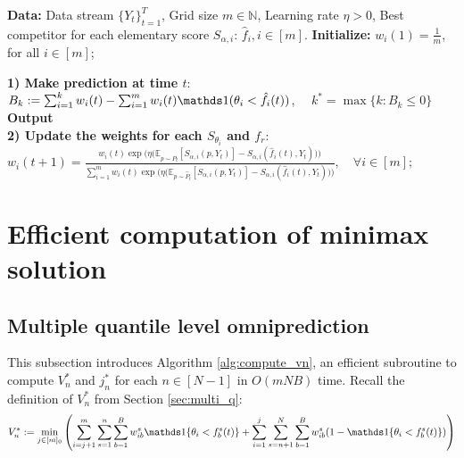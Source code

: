 \begin{algorithm}[h]
  \caption{Single quantile level omniprediction with pre-computed best competitor for each elementary score} 
  \begin{algorithmic}[1]
  \State \textbf{Data:} Data stream $\{Y_t\}_{t=1}^T$, Grid size $m \in \mathbb{N}$, Learning rate $\eta > 0$, Best competitor for each elementary score $S_{\alpha, i}$: $\hat{f}_i, i \in [m]$.
  \State \textbf{Initialize:} $w_{i}(1) = \frac{1}{m}$, for all $i \in [m]$;

    \State \textbf{1) Make prediction at time $t$}:
    \State $B_k := \sum_{i=1}^{k} w_{i}(t) - \sum_{i=1}^{m} w_{i}(t) \one(\theta_i < \hat{f}_i(t))$, $\quad k^* = \max\{k: B_k \leq 0\}$
      \State \textbf{Output}
       \vspace{-0.1cm}\\
      \State \textbf{2) Update the weights for each $S_{\theta_i}$ and $f_r$}:
          \State $w_{i}(t+1) = \frac{w_{i}(t) \exp\bigl(\eta \big(\mathbb{E}_{p \sim \hat{P}_t}[S_{\alpha, i}(p, Y_t)] 
          - S_{\alpha, i}(\hat{f}_i(t), Y_t)\big)\bigr)}{\sum_{i=1}^m w_{i}(t) \exp\bigl(\eta \big(\mathbb{E}_{p \sim \hat{P}_t}[S_{\alpha, i}(p, Y_t)] 
          - S_{\alpha, i}(\hat{f}_i(t), Y_t)\big)\bigr)}, \quad \forall i \in [m];$ \vspace{-0.1cm}\\
  \EndFor
  \end{algorithmic}
\end{algorithm}



\section{Efficient computation of minimax solution} \label{appsec:fast}
\subsection{Multiple quantile level omniprediction} \label{appsubsec:multi_q_fast}
This subsection introduces Algorithm \ref{alg:compute_vn}, an efficient subroutine to compute $V_n^*$ and $j_n^*$ for each $n \in [N-1]$ in $O(mNB)$ time. Recall the definition of $V_n^*$ from Section \ref{sec:multi_q}:
\[
  V_n^* := \min_{j \in [m]_0} \left( \sum_{i=j+1}^{m} \sum_{s=1}^{n} \sum_{b=1}^B w_{ib}^s \indi{\theta_i < f_b^s(t)} + \sum_{i=1}^{j} \sum_{s=n+1}^{N}  \sum_{b=1}^B w_{ib}^s (1 - \indi{\theta_i < f_b^s(t)})\right)
\]

